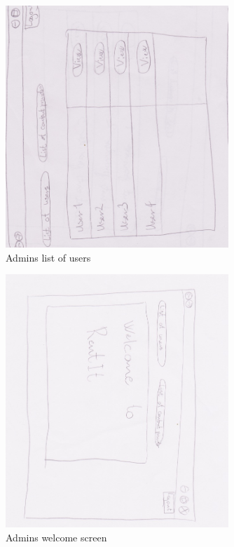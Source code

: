 \begin{figure}[!ht]
  \centering
    \includegraphics[width=0.75\textwidth]{Parts/Appendix/Images/PaperMockup/AdminListOfUsers}
  \caption{Admins list of users}
  \label{fig:Appendix_GUI_sketches_AdminListofUsers}
\end{figure}

\begin{figure}[!ht]
  \centering
    \includegraphics[width=0.75\textwidth]{Parts/Appendix/Images/PaperMockup/AdminWelcome}
  \caption{Admins welcome screen}
  \label{fig:Appendix_GUI_sketches_AdminWelcome}
\end{figure}

